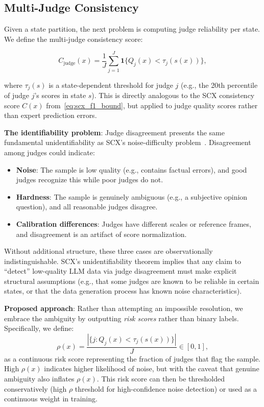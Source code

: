 \documentclass[11pt,twocolumn]{article}
\begin{document}
\subsection{Multi-Judge Consistency}
\label{sec:multi_judge}

Given a state partition, the next problem is computing judge reliability per state. We define the multi-judge consistency score:

\begin{equation}
C_{\text{judge}}(x) = \frac{1}{J} \sum_{j=1}^J \mathbf{1}\{Q_j(x) < \tau_j(s(x))\},
\label{eq:multi_judge_consistency}
\end{equation}

where $\tau_j(s)$ is a state-dependent threshold for judge $j$ (e.g., the 20th percentile of judge $j$'s scores in state $s$). This is directly analogous to the SCX consistency score $C(x)$ from~\eqref{eq:scx_f1_bound}, but applied to judge quality scores rather than expert prediction errors.

\textbf{The identifiability problem}: Judge disagreement presents the same fundamental unidentifiability as SCX's noise-difficulty problem~\cite{scx2026}. Disagreement among judges could indicate:
\begin{itemize}
    \item \textbf{Noise}: The sample is low quality (e.g., contains factual errors), and good judges recognize this while poor judges do not.
    \item \textbf{Hardness}: The sample is genuinely ambiguous (e.g., a subjective opinion question), and all reasonable judges disagree.
    \item \textbf{Calibration differences}: Judges have different scales or reference frames, and disagreement is an artifact of score normalization.
\end{itemize}

Without additional structure, these three cases are observationally indistinguishable. SCX's unidentifiability theorem implies that any claim to ``detect'' low-quality LLM data via judge disagreement must make explicit structural assumptions (e.g., that some judges are known to be reliable in certain states, or that the data generation process has known noise characteristics).

\textbf{Proposed approach}: Rather than attempting an impossible resolution, we embrace the ambiguity by outputting \textit{risk scores} rather than binary labels. Specifically, we define:
\begin{equation}
\rho(x) = \frac{|\{j: Q_j(x) < \tau_j(s(x))\}|}{J} \in [0, 1],
\label{eq:risk_score}
\end{equation}
as a continuous risk score representing the fraction of judges that flag the sample. High $\rho(x)$ indicates higher likelihood of noise, but with the caveat that genuine ambiguity also inflates $\rho(x)$. This risk score can then be thresholded conservatively (high $\rho$ threshold for high-confidence noise detection) or used as a continuous weight in training.
\end{document}

